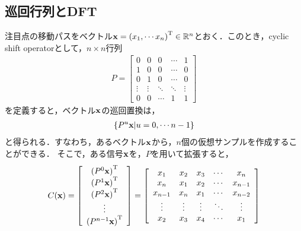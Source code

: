 \documentclass[11pt,a4j]{jarticle}
\begin{document}
    \subsection{巡回行列とDFT}
      注目点の移動パスをベクトル${\bf x} = {(x_1, \cdots x_n)}^{\mathrm{T}} \in \mathbb{R}^{n}$とおく．このとき，cyclic shift operatorとして，$n \times n$行列
      \begin{align}
        P = 
        \left[
          \begin{array}{ccccc}
            0 & 0 & 0 & \cdots & 1 \\
            1 & 0 & 0 & \cdots & 0 \\
            0 & 1 & 0 & \cdots & 0 \\
            \vdots&\vdots&\ddots&\ddots&\vdots \\
            0 & 0 & \cdots & 1 & 1
          \end{array}
        \right]
      \end{align}
      を定義すると，ベクトル${\bf x}$の巡回置換は，
      \begin{align}
        \left\{ {P}^{u}{\bf x} | u=0,\cdots n-1 \right\}
      \end{align}
      と得られる．すなわち，あるベクトル$\bf x$から，$n$個の仮想サンプルを作成することができる．
      そこで，ある信号$\bf x$を，$P$を用いて拡張すると，
      \begin{align}
        C({\bf x}) = 
        \left[
          \begin{array}{c}
            {({P}^{0} {\bf x})}^{\mathrm{T}} \\
            {({P}^{1} {\bf x})}^{\mathrm{T}} \\
            {({P}^{2} {\bf x})}^{\mathrm{T}} \\
            \vdots \\
            {({P}^{n-1} {\bf x})}^{\mathrm{T}} 
          \end{array}
        \right]
        = 
        \left[
          \begin{array}{ccccc}
            x_1 & x_2 & x_3 & \cdots & x_n \\
            x_n & x_1 & x_2 & \cdots & x_{n-1} \\
            x_{n-1} & x_n & x_1 & \cdots & x_{n-2} \\
            \vdots&\vdots&\vdots&\ddots&\vdots \\
            x_2 & x_3 & x_4 & \cdots  & x_1
          \end{array}
        \right]
      \end{align}
\end{document}
